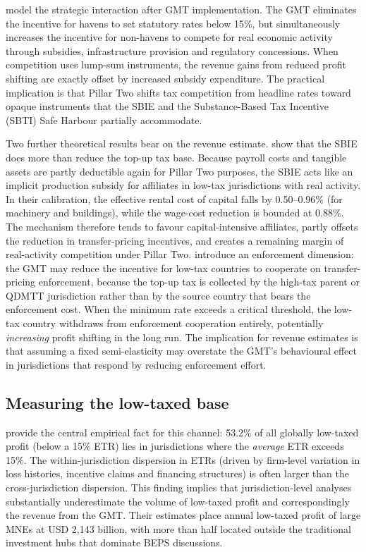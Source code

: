 \documentclass[11pt,a4paper]{article}
\begin{document}
\citet{janeba2023} model the strategic interaction after GMT implementation. The GMT eliminates the incentive for havens to set statutory rates below 15\%, but simultaneously increases the incentive for non-havens to compete for real economic activity through subsidies, infrastructure provision and regulatory concessions. When competition uses lump-sum instruments, the revenue gains from reduced profit shifting are exactly offset by increased subsidy expenditure. The practical implication is that Pillar Two shifts tax competition from headline rates toward opaque instruments that the SBIE and the Substance-Based Tax Incentive (SBTI) Safe Harbour partially accommodate.

Two further theoretical results bear on the revenue estimate. \citet{schjelderup2024} show that the SBIE does more than reduce the top-up tax base. Because payroll costs and tangible assets are partly deductible again for Pillar Two purposes, the SBIE acts like an implicit production subsidy for affiliates in low-tax jurisdictions with real activity. In their calibration, the effective rental cost of capital falls by 0.50--0.96\% (for machinery and buildings), while the wage-cost reduction is bounded at 0.88\%. The mechanism therefore tends to favour capital-intensive affiliates, partly offsets the reduction in transfer-pricing incentives, and creates a remaining margin of real-activity competition under Pillar Two. \citet{jean2026} introduce an enforcement dimension: the GMT may reduce the incentive for low-tax countries to cooperate on transfer-pricing enforcement, because the top-up tax is collected by the high-tax parent or QDMTT jurisdiction rather than by the source country that bears the enforcement cost. When the minimum rate exceeds a critical threshold, the low-tax country withdraws from enforcement cooperation entirely, potentially \textit{increasing} profit shifting in the long run. The implication for revenue estimates is that assuming a fixed semi-elasticity may overstate the GMT's behavioural effect in jurisdictions that respond by reducing enforcement effort.

\subsection{Measuring the low-taxed base}\label{sec:measurement}

\citet{hugger2026} provide the central empirical fact for this channel: 53.2\% of all globally low-taxed profit (below a 15\% ETR) lies in jurisdictions where the \textit{average} ETR exceeds 15\%. The within-jurisdiction dispersion in ETRs (driven by firm-level variation in loss histories, incentive claims and financing structures) is often larger than the cross-jurisdiction dispersion. This finding implies that jurisdiction-level analyses substantially underestimate the volume of low-taxed profit and correspondingly the revenue from the GMT. Their estimates place annual low-taxed profit of large MNEs at USD 2,143 billion, with more than half located outside the traditional investment hubs that dominate BEPS discussions.
\end{document}
